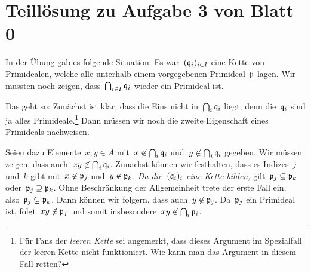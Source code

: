 \documentclass{uebblatt}
\begin{document}
\section*{Teillösung zu Aufgabe 3 von Blatt 0}

In der Übung gab es folgende Situation: Es war~$(\mathfrak{q}_i)_{i \in I}$ eine Kette
von Primidealen, welche alle unterhalb einem vorgegebenen Primideal~$\mathfrak{p}$
lagen. Wir mussten noch zeigen, dass~$\bigcap_{i \in I} \mathfrak{q}_i$ wieder ein
Primideal ist.

Das geht so: Zunächst ist klar, dass die Eins nicht in~$\bigcap_i \mathfrak{q}_i$
liegt, denn die~$\mathfrak{q}_i$ sind ja alles Primideale.\footnote{Für Fans der
\emph{leeren Kette} sei angemerkt, dass dieses Argument im Spezialfall der
leeren Kette nicht funktioniert. Wie kann man das Argument in diesem Fall
retten?} Dann müssen wir noch die zweite Eigenschaft eines Primideals
nachweisen.

Seien dazu Elemente~$x,y \in A$ mit~$x \not\in \bigcap_i \mathfrak{q}_i$ und~$y \not\in
\bigcap_i \mathfrak{q}_i$ gegeben. Wir müssen zeigen, dass auch~$xy \not\in \bigcap_i \mathfrak{q}_i$.
Zunächst können wir festhalten, dass es Indizes~$j$ und~$k$ gibt mit~$x \not\in
\mathfrak{p}_j$ und~$y \not\in \mathfrak{p}_k$. \emph{Da die~$(\mathfrak{q}_i)_i$ eine Kette bilden,}
gilt~$\mathfrak{p}_j \subseteq \mathfrak{p}_k$ oder~$\mathfrak{p}_j \supseteq \mathfrak{p}_k$. Ohne
Beschränkung der Allgemeinheit trete der erste Fall ein, also~$\mathfrak{p}_j \subseteq
\mathfrak{p}_k$. Dann können wir folgern, dass auch~$y \not\in \mathfrak{p}_j$. Da~$\mathfrak{p}_j$ ein
Primideal ist, folgt~$xy \not\in \mathfrak{p}_j$ und somit insbesondere~$xy \not\in
\bigcap_i \mathfrak{p}_i$.
\end{document}
